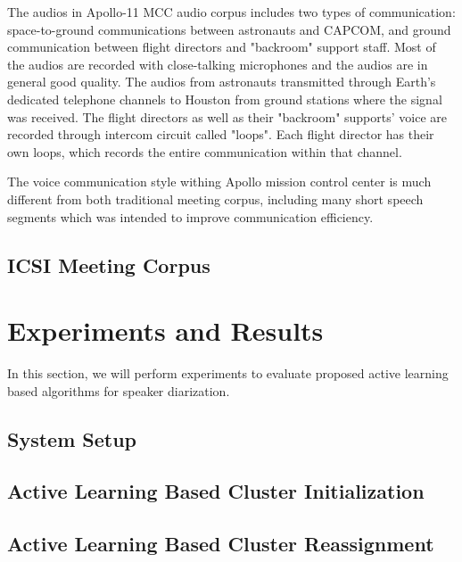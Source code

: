 \documentclass[final,authoryear,5p,times,twocolumn]{elsarticle}
\begin{document}
The audios in Apollo-11 MCC audio corpus includes two types of communication: space-to-ground communications between astronauts and CAPCOM, and ground communication between flight directors and "backroom" support staff. Most of the audios are recorded with close-talking microphones and the audios are in general good quality. The audios from astronauts transmitted through Earth's dedicated telephone channels to Houston from ground stations where the signal was received. The flight directors as well as their "backroom" supports' voice are recorded through intercom circuit called "loops". Each flight director has their own loops, which records the entire communication within that channel.

The voice communication style withing Apollo mission control center is much different from both traditional meeting corpus, including many short speech segments which was intended to improve communication efficiency. 



\subsection{ICSI Meeting Corpus}

\section{Experiments and Results}
In this section, we will perform experiments to evaluate proposed active learning based algorithms for speaker diarization. 
\subsection{System Setup}
\subsection{Active Learning Based Cluster Initialization}
\subsection{Active Learning Based Cluster Reassignment}




\end{document}
